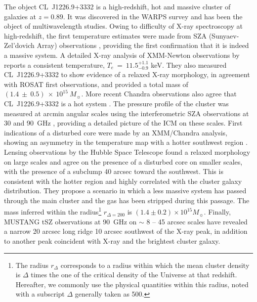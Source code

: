 \documentclass[twocolumn,traditabstract]{aa}
\begin{document}
The object \mbox{CL~J1226.9+3332} is a high-redshift, hot and massive cluster of galaxies at $z = 0.89$. It was discovered in the WARPS survey  \citep[Wide Angle ROSAT Pointed Survey,][]{ebeling2001} and has been the object of multiwavelength studies. Owing to difficulty of \mbox{X-ray} spectroscopy at high-redshift, the first temperature estimates were made from SZA (Sunyaev-Zel'dovich Array) observations \citep[][$T_e~=~9.8^{+4.7}_{-1.9}$ keV]{joy2001}, providing the first confirmation that it is indeed a massive system. A detailed \mbox{X-ray} analysis of \mbox{XMM-Newton} observations by \cite{maughan2004} reports a consistent temperature, $T_e~=~11.5^{+1.1}_{-0.9}$ keV. They also measured \mbox{CL~J1226.9+3332} to show evidence of a relaxed \mbox{X-ray} morphology, in agreement with ROSAT first observations, and provided a total mass of $\left(1.4~\pm~0.5\right)~\times~10^{15} \ M_{\sun}$. More recent Chandra observations also agree that \mbox{CL~J1226.9+3332} is a hot system \citep[][$T_e~=~14.0^{+2.1}_{-1.8}$ keV]{bonamente2006}. The pressure profile of the cluster was measured at arcmin angular scales using the interferometric SZA observations at 30 and 90~GHz \citep{muchovej2007,mroczkowski2009,mroczkowski2011}, providing a detailed picture of the ICM on these scales. First indications of a disturbed core were made by an XMM/Chandra analysis, showing an asymmetry in the temperature map with a hotter southwest region \citep{maughan2007}. Lensing observations by the Hubble Space Telescope \citep[HST][]{jee2009} found a relaxed morphology on large scales and agree on the presence of a disturbed core on smaller scales, with the presence of a subclump 40 arcsec toward the southwest. This is consistent with the hotter region and highly correlated with the cluster galaxy distribution. They propose a scenario in which a less massive system has passed through the main cluster and the gas has been stripped during this passage. The mass inferred within the radius\footnote{The radius $r_{\Delta}$ corresponds to a radius within which the mean cluster density is $\Delta$ times the one of the critical density of the Universe at that redshift. Hereafter, we commonly use the physical quantities within this radius, noted with a subscript $\Delta$ generally taken as 500.} $r_{\Delta=200}$ is $(1.4 \pm 0.2) \times 10^{15} M_{\sun}$. Finally, MUSTANG tSZ observations at 90~GHz on $\sim$ 8 -- 45 arcsec scales \citep{korngut2011} have revealed a narrow 20 arcsec long ridge 10 arcsec southwest of the \mbox{X-ray} peak, in addition to another peak coincident with \mbox{X-ray} and the brightest cluster galaxy.
\end{document}
